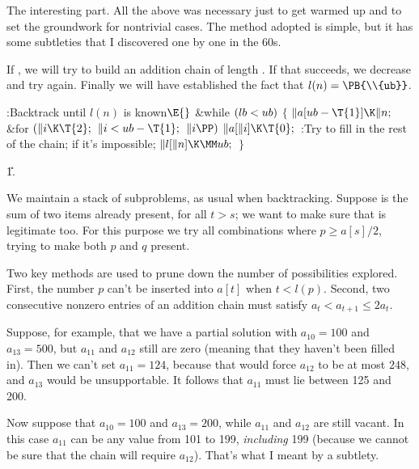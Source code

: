 The interesting part. All the above was necessary just to get
warmed up and to set the groundwork for nontrivial cases.
The method adopted is simple, but it has some subtleties that
I discovered one by one in the 60s.

If , we will try to build an addition chain of length .
If that succeeds, we decrease  and try again. Finally we will
have established the fact that $l(n)=\PB{\\{ub}}$.

\Y\B\4:Backtrack until $l(n)$ is known\X${}\E{}$\6
\&{while} ${}(\\{lb}<\\{ub}){}$\5
${}\{{}$\1\6
${}\|a[\\{ub}-\T{1}]\K\|n;{}$\6
\&{for} ${}(\|i\K\T{2};{}$ ${}\|i<\\{ub}-\T{1};{}$ ${}\|i\PP){}$\1\5
${}\|a[\|i]\K\T{0};{}$\2\6
:Try to fill in the rest of the chain;  if it's
impossible\X;\6
${}\|l[\|n]\K\MM\\{ub};{}$\6
\4${}\}{}$\2\par
\U1.\fi

We maintain a stack of subproblems, as usual when backtracking.
Suppose  is the sum of two items already present, for all
$t>s$; we want to make sure that  is legitimate too.
For this purpose we try all combinations  where
$p\ge a[s]/2$, trying to make both $p$ and $q$ present.

Two key methods are used to prune down the number of possibilities
explored. First, the number $p$ can't be inserted into $a[t]$ when $t<l(p)$.
Second, two consecutive nonzero entries of an addition chain must
satisfy $a_t<a_{t+1}\le 2a_t$.

Suppose, for example, that we have a partial solution with $a_{10}=100$
and $a_{13}=500$, but $a_{11}$ and $a_{12}$ still are zero (meaning that
they haven't been filled in). Then we can't set $a_{11}=124$, because
that would force $a_{12}$ to be at most $248$, and $a_{13}$ would be
unsupportable. It follows that $a_{11}$ must lie between 125 and 200.

Now suppose that $a_{10}=100$ and $a_{13}=200$, while $a_{11}$ and
$a_{12}$ are still vacant. In this case $a_{11}$ can be any value
from 101 to 199, {\it including\/} 199 (because we cannot be
sure that the chain will require $a_{12}$). That's what I meant
by a subtlety.

